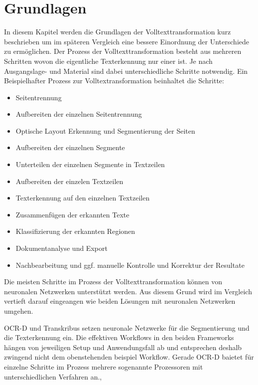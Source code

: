 \documentclass[a4paper,oneside, 12pt]{report}
\begin{document}
\chapter{Grundlagen}\label{sec:grundlagen}
In diesem Kapitel werden die Grundlagen der Volltexttransformation kurz beschrieben um im späteren Vergleich eine bessere Einordnung der Unterschiede zu ermöglichen. Der Prozess der Volltexttransformation besteht aus mehreren Schritten wovon die eigentliche Texterkennung nur einer ist. Je nach Ausgangslage- und Material sind dabei unterschiedliche Schritte notwendig. Ein Beispielhafter Prozess zur Volltextransformation beinhaltet die Schritte:
\begin{itemize}\itemsep=0.5pt
  \item Seitentrennung
  \item Aufbereiten der einzelnen Seitentrennung
  \item Optische Layout Erkennung und Segmentierung der Seiten
  \item Aufbereiten der einzelnen Segmente
  \item Unterteilen der einzelnen Segmente in Textzeilen
  \item Aufbereiten der einzelen Textzeilen
  \item Texterkennung auf den einzelnen Textzeilen
  \item Zusammenfügen der erkannten Texte
  \item Klassifizierung der erkannten Regionen
  \item Dokumentanalyse und Export
  \item Nachbearbeitung und ggf. manuelle Kontrolle und Korrektur der Resultate
\end{itemize}

Die meisten Schritte im Prozess der Volltexttransformation können von neuronalen Netzwerken unterstützt werden. Aus diesem Grund wird im Vergleich vertieft darauf eingeangen wie beiden Lösungen mit neuronalen Netzwerken umgehen. 

OCR-D und Transkribus setzen neuronale Netzwerke für die Segmentierung und die Texterkennung ein. Die effektiven Workflows in den beiden Frameworks hängen von jeweiligen Setup und Anwendungsfall ab und entsprechen deshalb zwingend nicht dem obenstehenden beispiel Workflow. Gerade OCR-D baietet für einzelne Schritte im Prozess mehrere sogenannte Prozessoren mit unterschiedlichen Verfahren an.\cite{transkribus}, \cite{ocrdworkflows} 
 
\end{document}
